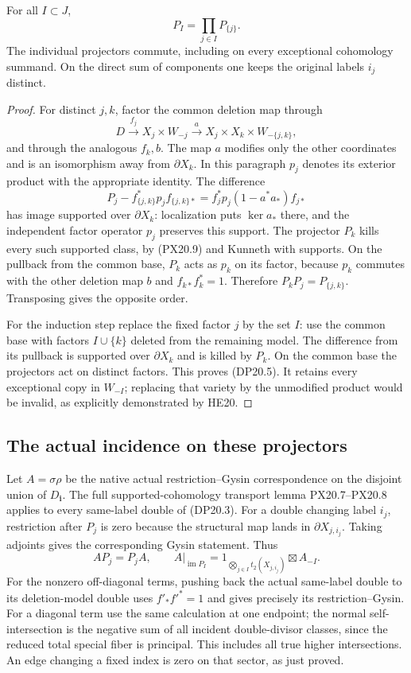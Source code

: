 \begin{lemma}
\label{r20dp:projectors}
For all $I\subset J$,
\[
                 P_I=\prod_{j\in I}P_{\{j\}}.
 \tag{DP20.5}
\]
The individual projectors commute, including on every exceptional
cohomology summand. On the direct sum of components one keeps
the original labels $i_j$ distinct.
\end{lemma}

\begin{proof}
For distinct $j,k$, factor the common deletion map through
\[
 D\xrightarrow{f_j}X_j\times W_{-j}
       \xrightarrow{a}X_j\times X_k\times W_{-\{j,k\}},
 \tag{DP20.6}
\]
and through the analogous $f_k,b$. The map $a$ modifies only
the other coordinates and is an isomorphism away from
$\partial X_k$. In this paragraph $p_j$ denotes its exterior
product with the appropriate identity. The difference
\[
 P_j-f_{\{j,k\}}^*p_jf_{\{j,k\}*}
       =f_j^*p_j(1-a^*a_*)f_{j*}
 \tag{DP20.7}
\]
has image supported over $\partial X_k$: localization puts
$\ker a_*$ there, and the independent factor operator $p_j$
preserves this support. The projector $P_k$ kills every such
supported class, by (PX20.9) and Kunneth with supports.
On the pullback from the common base, $P_k$ acts as $p_k$ on
its factor, because $p_k$ commutes with the other deletion map
$b$ and $f_{k*}f_k^*=1$. Therefore
$P_kP_j=P_{\{j,k\}}$. Transposing gives the opposite order.

For the induction step replace the fixed factor $j$ by the set
$I$: use the common base with factors $I\cup\{k\}$ deleted
from the remaining model. The difference from its pullback is
supported over $\partial X_k$ and is killed by $P_k$.
On the common base the projectors act on distinct factors.
This proves (DP20.5). It retains every exceptional copy in
$W_{-I}$; replacing that variety by the unmodified product would
be invalid, as explicitly demonstrated by HE20.
\end{proof}

\subsection{The actual incidence on these projectors}

Let $A=\sigma\rho$ be the native actual restriction--Gysin
correspondence on the disjoint union of $D_{\mathbf i}$.
The full supported-cohomology transport lemma PX20.7--PX20.8
applies to every same-label double of (DP20.3).
For a double changing label $i_j$, restriction after $P_j$ is
zero because the structural map lands in $\partial X_{j,i_j}$.
Taking adjoints gives the corresponding Gysin statement.
Thus
\[
 AP_j=P_jA,\qquad
 A|_{\operatorname{im}P_I}
       =1_{\bigotimes_{j\in I}t_2(X_{j,i_j})}\boxtimes A_{-I}.
 \tag{DP20.8}
\]
For the nonzero off-diagonal terms, pushing back the actual
same-label double to its deletion-model double uses
$f'_*f'^*=1$ and gives precisely its restriction--Gysin.
For a diagonal term use the same calculation at one endpoint;
the normal self-intersection is the negative sum of all incident
double-divisor classes, since the reduced total special fiber is
principal. This includes all true higher intersections. An edge
changing a fixed index is zero on that sector, as just proved.

